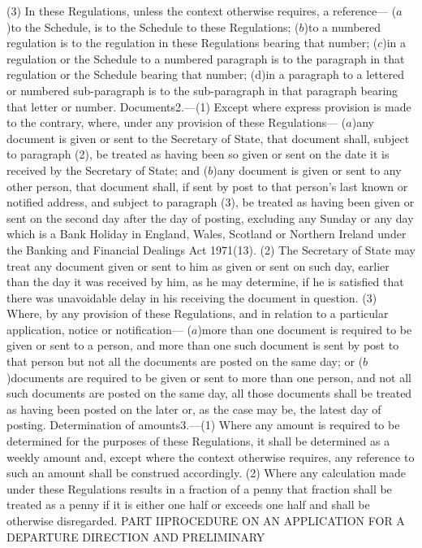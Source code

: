 \documentclass[a4paper]{article}
\begin{document}
(3) In these Regulations, unless the context otherwise requires, a reference—
($a$)to the Schedule, is to the Schedule to these Regulations;
($b$)to a numbered regulation is to the regulation in these Regulations bearing
that number;
($c$)in a regulation or the Schedule to a numbered paragraph is to the paragraph
in that regulation or the Schedule bearing that number;
(d)in a paragraph to a lettered or numbered sub-paragraph is to the
sub-paragraph in that paragraph bearing that letter or number.
Documents2.—(1) Except where express provision is made to the contrary, where,
under any provision of these Regulations—
($a$)any document is given or sent to the Secretary of State, that document shall,
subject to paragraph (2), be treated as having been so given or sent on the date
it is received by the Secretary of State; and
($b$)any document is given or sent to any other person, that document shall, if
sent by post to that person’s last known or notified address, and subject to
paragraph (3), be treated as having been given or sent on the second day after
the day of posting, excluding any Sunday or any day which is a Bank Holiday in
England, Wales, Scotland or Northern Ireland under the Banking and Financial
Dealings Act 1971(13).
(2) The Secretary of State may treat any document given or sent to him as given
or sent on such day, earlier than the day it was received by him, as he may
determine, if he is satisfied that there was unavoidable delay in his receiving
the document in question.
(3) Where, by any provision of these Regulations, and in relation to a
particular application, notice or notification—
($a$)more than one document is required to be given or sent to a person, and more
than one such document is sent by post to that person but not all the documents
are posted on the same day; or
($b$)documents are required to be given or sent to more than one person, and not
all such documents are posted on the same day,
all those documents shall be treated as having been posted on the later or, as
the case may be, the latest day of posting.
Determination of amounts3.—(1) Where any amount is required to be determined for
the purposes of these Regulations, it shall be determined as a weekly amount
and, except where the context otherwise requires, any reference to such an
amount shall be construed accordingly.
(2) Where any calculation made under these Regulations results in a fraction of
a penny that fraction shall be treated as a penny if it is either one half or
exceeds one half and shall be otherwise disregarded.
PART IIPROCEDURE ON AN APPLICATION FOR A DEPARTURE DIRECTION AND PRELIMINARY
\end{document}
